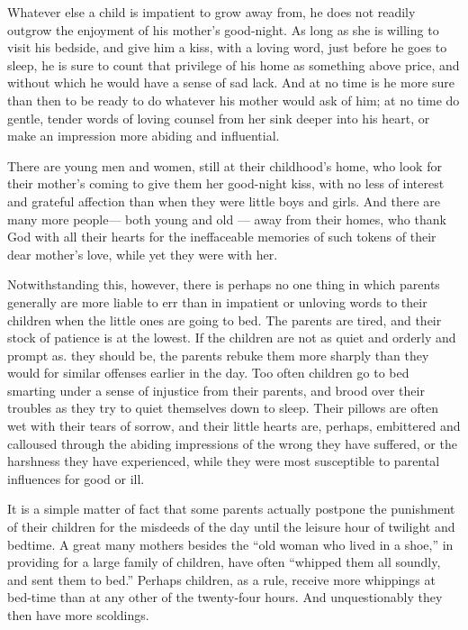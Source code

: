 \documentclass[
]{book}
\begin{document}
Whatever else a child is impatient to grow away from, he does not readily outgrow the enjoyment of his mother's good-night. As long as she is willing to visit his bedside, and give him a kiss, with a loving word, just before he goes to sleep, he is sure to count that privilege of his home as something above price, and without which he would have a sense of sad lack. And at no time is he more sure than then to be ready to do whatever his mother would ask of him; at no time do gentle, tender words of loving counsel from her sink deeper into his heart, or make an impression more abiding and influential.

There are young men and women, still at their childhood's home, who look for their mother's coming to give them her good-night kiss, with no less of interest and grateful affection than when they were little boys and girls. And there are many more people--- both young and old --- away from their homes, who thank God with all their hearts for the ineffaceable memories of such tokens of their dear mother's love, while yet they were with her.

Notwithstanding this, however, there is perhaps no one thing in which parents generally are more liable to err than in impatient or unloving words to their children when the little ones are going to bed. The parents are tired, and their stock of patience is at the lowest. If the children are not as quiet and orderly and prompt as. they should be, the parents rebuke them more sharply than they would for similar offenses earlier in the day. Too often children go to bed smarting under a sense of injustice from their parents, and brood over their troubles as they try to quiet themselves down to sleep. Their pillows are often wet with their tears of sorrow, and their little hearts are, perhaps, embittered and calloused through the abiding impressions of the wrong they have suffered, or the harshness they have experienced, while they were most susceptible to parental influences for good or ill.

It is a simple matter of fact that some parents actually postpone the punishment of their children for the misdeeds of the day until the leisure hour of twilight and bedtime. A great many mothers besides the ``old woman who lived in a shoe,'' in providing for a large family of children, have often ``whipped them all soundly, and sent them to bed.'' Perhaps children, as a rule, receive more whippings at bed-time than at any other of the twenty-four hours. And unquestionably they then have more scoldings.
\end{document}
